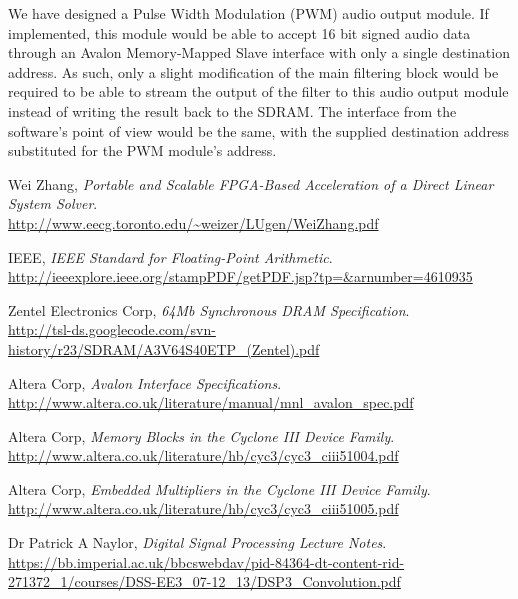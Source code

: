 \documentclass[]{article}
\begin{document}
We have designed a Pulse Width Modulation (PWM) audio output module. If implemented, this module would be able to accept 16 bit signed audio data through an Avalon Memory-Mapped Slave interface with only a single destination address.
As such, only a slight modification of the main filtering block would be required to be able to stream the output of the filter to this audio output module instead of writing the result back to the SDRAM.
The interface from the software's point of view would be the same, with the supplied destination address substituted for the PWM module's address.



\clearpage

\begin{thebibliography}{9}
	Wei Zhang,
	\emph{Portable and Scalable FPGA-Based Acceleration of a Direct Linear System Solver}. \\
	\url{http://www.eecg.toronto.edu/~weizer/LUgen/WeiZhang.pdf}

	IEEE,
	\emph{IEEE Standard for Floating-Point Arithmetic}. \\
	\url{http://ieeexplore.ieee.org/stampPDF/getPDF.jsp?tp=&arnumber=4610935}

	Zentel Electronics Corp,
	\emph{64Mb Synchronous DRAM Specification}. \\
	\url{http://tsl-ds.googlecode.com/svn-history/r23/SDRAM/A3V64S40ETP_(Zentel).pdf}

	Altera Corp,
	\emph{Avalon Interface Specifications}. \\
	\url{http://www.altera.co.uk/literature/manual/mnl_avalon_spec.pdf}

	Altera Corp,
	\emph{Memory Blocks in the Cyclone III Device Family}. \\
	\url{http://www.altera.co.uk/literature/hb/cyc3/cyc3_ciii51004.pdf}

	Altera Corp,
	\emph{Embedded Multipliers in the Cyclone III Device Family}. \\
	\url{http://www.altera.co.uk/literature/hb/cyc3/cyc3_ciii51005.pdf}


	Dr Patrick A Naylor,
	\emph{Digital Signal Processing Lecture Notes}. \\
	\url{https://bb.imperial.ac.uk/bbcswebdav/pid-84364-dt-content-rid-271372_1/courses/DSS-EE3_07-12_13/DSP3_Convolution.pdf}


\end{thebibliography}
\end{document}
